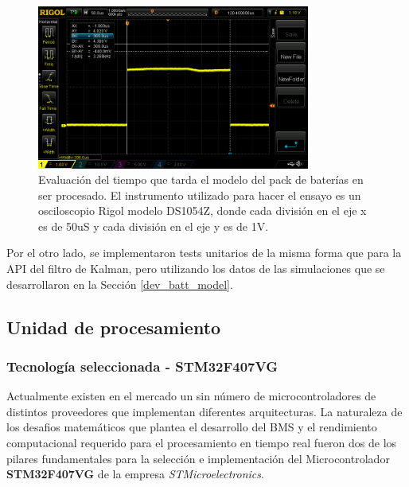\documentclass[10pt, a4paper]{article}
\begin{document}
\begin{figure}[h!]
    \begin{center}
        \includegraphics[width=0.8\textwidth]{kalman_time.png}
        \caption{Evaluaci\'on del tiempo que tarda el modelo del pack de
        bater\'ias en ser procesado. El instrumento utilizado para hacer el
        ensayo es un osciloscopio Rigol modelo DS1054Z, donde cada divisi\'on en
        el eje x es de 50uS y cada divisi\'on en el eje y es de 1V.}
        \label{kalman_filter_embedded}
    \end{center}
\end{figure}

Por el otro lado, se implementaron tests unitarios de la misma forma que para la
\acrshort{API} del filtro de Kalman, pero utilizando los datos de las
simulaciones que se desarrollaron en la Secci\'on \ref{dev_batt_model}.

\subsection{Unidad de procesamiento}

\subsubsection{Tecnología seleccionada - STM32F407VG}

Actualmente existen en el mercado un sin número de microcontroladores de
distintos proveedores que implementan diferentes arquitecturas. La naturaleza de
los desafios matemáticos que plantea el desarrollo del \acrshort{BMS} y el
rendimiento computacional requerido para el procesamiento en tiempo real fueron
dos de los pilares fundamentales para la selección e implementación del
Microcontrolador \textbf{STM32F407VG} de la empresa \emph{STMicroelectronics}. 
\end{document}
